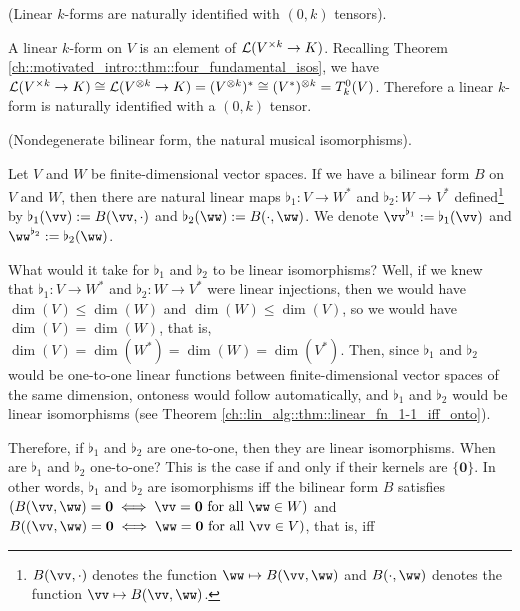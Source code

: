 \begin{remark}
\label{ch::bilinear_forms_metric_tensors::rmk::linear_k_forms_0_k_tensors}

    (Linear $k$-forms are naturally identified with $(0, k)$ tensors).
    
    A linear $k$-form on $V$ is an element of $\mathcal{L}(V^{\times k} \rightarrow K)$. Recalling Theorem \ref{ch::motivated_intro::thm::four_fundamental_isos}, we have $\mathcal{L}(V^{\times k} \rightarrow K) \cong \mathcal{L}(V^{\otimes k} \rightarrow K) = (V^{\otimes k})^* \cong (V^*)^{\otimes k} = T^0_k(V)$. Therefore a linear $k$-form is naturally identified with a $(0, k)$ tensor.
\end{remark}

\begin{defn}
\label{ch::bilinear_forms_metric_tensors::defn::nondegen_bilinear_form}

    (Nondegenerate bilinear form, the natural musical isomorphisms).
    
    Let $V$ and $W$ be finite-dimensional vector spaces. If we have a bilinear form $B$ on $V$ and $W$, then there are natural linear maps $\flat_1:V \rightarrow W^{*}$ and $\flat_2:W \rightarrow V^{*}$ defined\footnote{$B(\vv, \cdot)$ denotes the function $\ww \mapsto B(\vv, \ww)$ and $B(\cdot, \ww)$ denotes the function $\vv \mapsto B(\vv, \ww)$.} by $\flat_1(\vv) := B(\vv, \cdot)$ and $\flat_2(\ww) := B(\cdot, \ww)$. We denote $\vv^{\flat_1} := \flat_1(\vv)$ and $\ww^{\flat_2} := \flat_2(\ww)$.
    
    What would it take for $\flat_1$ and $\flat_2$ to be linear isomorphisms? Well, if we knew that $\flat_1:V \rightarrow W^{*}$ and $\flat_2:W \rightarrow V^{*}$ were linear injections, then we would have $\dim(V) \leq \dim(W)$ and $\dim(W) \leq \dim(V)$, so we would have $\dim(V) = \dim(W)$, that is, $\dim(V) = \dim(W^*) = \dim(W) = \dim(V^*)$. Then, since $\flat_1$ and $\flat_2$ would be one-to-one linear functions between finite-dimensional vector spaces of the same dimension, ontoness would follow automatically, and $\flat_1$ and $\flat_2$ would be linear isomorphisms (see Theorem \ref{ch::lin_alg::thm::linear_fn_1-1_iff_onto}).

    \newpage

    Therefore, if $\flat_1$ and $\flat_2$ are one-to-one, then they are linear isomorphisms. When are $\flat_1$ and $\flat_2$ one-to-one? This is the case if and only if their kernels are $\{\mathbf{0}\}$. In other words, $\flat_1$ and $\flat_2$ are isomorphisms iff the bilinear form $B$ satisfies $(B(\vv, \ww) = \mathbf{0} \iff \vv = \mathbf{0} \text{ for all } \ww \in W)$ and $B((\vv, \ww) = \mathbf{0} \iff \ww = \mathbf{0} \text{ for all } \vv \in V)$, that is, iff
    

\end{defn}
